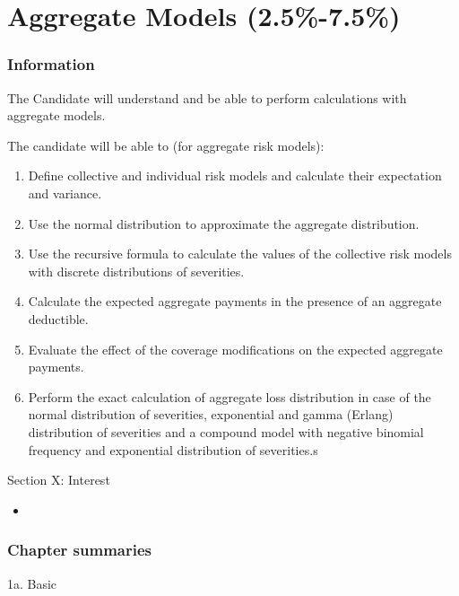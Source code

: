 \chapter[Aggregate Models]{Aggregate Models (2.5\%-7.5\%)}

\subsection{Information}

\begin{distributions}[Objective]
The Candidate will understand and be able to perform calculations with aggregate models.
\end{distributions}

\begin{outcomes}
The candidate will be able to (for aggregate risk models):
\begin{enumerate}[label = \alph*), leftmargin = *]
	\item	Define collective and individual risk models and calculate their expectation and variance.
	\item	Use the normal distribution to approximate the aggregate distribution.
	\item	Use the recursive formula to calculate the values of the collective risk models with discrete distributions of severities.
	\item	Calculate the expected aggregate payments in the presence of an aggregate deductible.
	\item	Evaluate the effect of the coverage modifications on the expected aggregate payments.
	\item	Perform the exact calculation of aggregate loss distribution in case of the normal distribution of severities, exponential and gamma (Erlang) distribution of severities and a compound model with negative binomial frequency and exponential distribution of severities.s
\end{enumerate}
\end{outcomes}

\begin{ASM_chapter}
Section X: Interest 
\begin{itemize}[leftmargin = *]
	\item	{}
\end{itemize}
\end{ASM_chapter}

\subsection{Chapter summaries}

\begin{CHPT_SUMM_AUTO}[label = {L.-1a}]{1a. Basic}

\end{CHPT_SUMM_AUTO}
